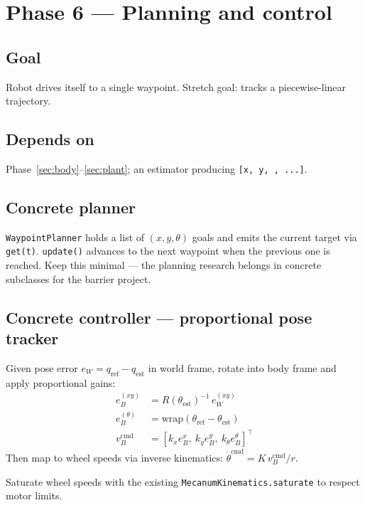 \documentclass[11pt,a4paper]{article}
\newcommand{\code}[1]{\texttt{\small #1}}
\begin{document}
\section{Phase 6 --- Planning and control}
\label{sec:control}

\subsection*{Goal}
Robot drives itself to a single waypoint. Stretch goal: tracks a
piecewise-linear trajectory.

\subsection*{Depends on}
Phase~\ref{sec:body}--\ref{sec:plant}; an estimator producing
\code{[x, y, \theta, ...]}.

\subsection*{Concrete planner}

\code{WaypointPlanner} holds a list of $(x, y, \theta)$ goals and emits
the current target via \code{get(t)}. \code{update()} advances to the next
waypoint when the previous one is reached. Keep this minimal --- the
planning research belongs in concrete subclasses for the barrier project.

\subsection*{Concrete controller --- proportional pose tracker}

Given pose error $e_W = q_{\text{ref}} - q_{\text{est}}$ in world frame,
rotate into body frame and apply proportional gains:
\begin{align}
    e_B^{(xy)} &= R(\theta_{\text{est}})^{-1}\, e_W^{(xy)} \\
    e_B^{(\theta)} &= \mathrm{wrap}(\theta_{\text{ref}} - \theta_{\text{est}}) \\
    v_B^{\text{cmd}} &= [k_x e_B^x,\ k_y e_B^y,\ k_\theta e_B^\theta]^\top
\end{align}
Then map to wheel speeds via inverse kinematics:
$\dot\theta^{\text{cmd}} = K\, v_B^{\text{cmd}} / r$.

Saturate wheel speeds with the existing \code{MecanumKinematics.saturate}
to respect motor limits.
\end{document}
